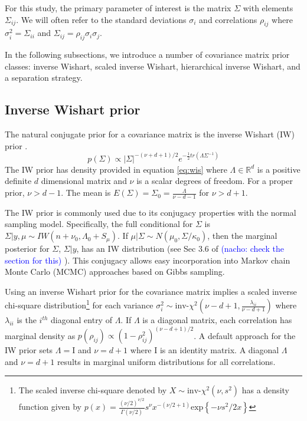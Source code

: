 \documentclass[12pt]{article}
\newcommand{\nacho}[1]{\textcolor{blue}{(nacho: #1)}}
\newcommand{\I}{\mathrm{I}}
\begin{document}
For this study, the primary parameter of interest is the matrix $\Sigma$ with elements $\Sigma_{ij}$. We will often refer to the standard deviations $\sigma_i$ and correlations $\rho_{ij}$ where $\sigma_i^2 = \Sigma_{ii}$ and $\Sigma_{ij} = \rho_{ij}\sigma_i\sigma_j$. 

In the following subsections, we introduce a number of covariance matrix prior classes: inverse Wishart, scaled inverse Wishart, hierarchical inverse Wishart, and a separation strategy. %

\subsection{Inverse Wishart prior \label{sec:iw}}

The natural conjugate prior for a covariance matrix is the inverse Wishart (IW) prior \citep{barnard2000}. 
\begin{equation} 
p(\Sigma) \propto  |\Sigma|^{-(\nu+ d +1)/2 } e^{-\frac{1}{2} tr( \Lambda \Sigma^{-1}) }
\label{eq:wis}
\end{equation}
The IW prior has density provided in equation \eqref{eq:wis} where $\Lambda\in \mathbb{R}^d$ is a positive definite $d$ dimensional matrix and $\nu$ is a scalar degrees of freedom. For a proper prior, $\nu>d-1$. The mean is $E(\Sigma) = \Sigma_0= \frac{\Lambda}{\nu - d - 1}$ for $\nu>d+1$. 

The IW prior is commonly used due to its conjugacy properties with the normal sampling model. Specifically, the full conditional for $\Sigma$ is $\Sigma \vert y,\mu \sim IW(n+\nu_0, \Lambda_0+S_\mu)$. If $\mu|\Sigma \sim N(\mu_0,\Sigma/\kappa_0)$, then the marginal posterior for $\Sigma$, $\Sigma|y$, has an IW distribution (see Sec 3.6 of \cite{bda2013} \nacho{check the section for this} ). This conjugacy allows easy incorporation into Markov chain Monte Carlo (MCMC) approaches based on Gibbs sampling.

Using an inverse Wishart prior for the covariance matrix implies a scaled inverse chi-square distribution\footnote{The scaled inverse chi-square denoted by $X \sim \mbox{inv-}\chi^2(\nu, s^2)$ has a density function given by $p(x) =  \frac{(\nu/2)^{\nu/2}} {\Gamma(\nu/2)} s^{\nu}x^{-(\nu/2 + 1)} \mbox{exp}\left\{-\nu s^2 / 2x\right\} $} for each variance $\sigma_i^2\sim \mbox{inv-}\chi^2(\nu - d + 1, \frac{\lambda_{ii}}{\nu-d+1} )$ where $\lambda_{ii}$ is the $i^{th}$ diagonal entry of $\Lambda$. If $\Lambda$ is a diagonal matrix, each correlation has marginal density as $p(\rho_{ij}) \propto (1 - \rho_{ij}^2)^{(\nu - d + 1)/2}$. A default approach for the IW prior sets $\Lambda=\I$ and $\nu=d+1$ where $\I$ is an identity matrix. A diagonal $\Lambda$ and $\nu=d+1$ results in marginal uniform distributions for all correlations. 
\end{document}
